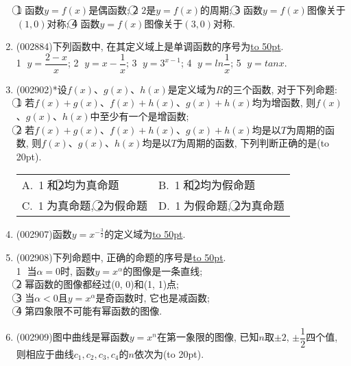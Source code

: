 \documentclass[10pt,a4paper]{article}
\newcommand{\blank}[1]{\underline{\hbox to #1pt{}}}
\newcommand{\bracket}[1]{(\hbox to #1pt{})}
\newcommand{\twoch}[4]{\par\begin{tabular}{p{.46\textwidth}p{.46\textwidth}}
A.~#1& B.~#2\\
C.~#3& D.~#4
\end{tabular}}
\begin{document}
\begin{enumerate}[1.]
\textcircled{1} 函数$y=f(x)$是偶函数; \textcircled{2} $2$是$y=f(x)$的周期; \textcircled{3} 函数$y=f(x)$图像关于$(1,0)$对称; \textcircled{4} 函数$y=f(x)$图像关于$(3,0)$对称.
\item {\tiny (002884)}下列函数中, 在其定义域上是单调函数的序号为\blank{50}.\\
\textcircled{1} $y=\dfrac{2-x}x$; \textcircled{2} $y=x-\dfrac 1x$; \textcircled{3} $y={3^{x-1}}$; \textcircled{4} $y=ln\dfrac 1x$; \textcircled{5} $y=tanx$.
\item {\tiny (002902)}*设$f(x)$、$g(x)$、$h(x)$是定义域为$R$的三个函数, 对于下列命题:\\
\textcircled{1} 若$f(x)+g(x)$、$f(x)+h(x)$、$g(x)+h(x)$均为增函数, 则$f(x)$、$g(x)$、$h(x)$中至少有一个是增函数;\\
\textcircled{2} 若$f(x)+g(x)$、$f(x)+h(x)$、$g(x)+h(x)$均是以$T$为周期的函数, 则$f(x)$、$g(x)$、$h(x)$均是以$T$为周期的函数, 下列判断正确的是\bracket{20}.
\twoch{\textcircled{1}和\textcircled{2}均为真命题}{\textcircled{1}和\textcircled{2}均为假命题}{\textcircled{1}为真命题, \textcircled{2}为假命题}{\textcircled{1}为假命题, \textcircled{2}为真命题}
\item {\tiny (002907)}函数$y=x^{-\frac 32}$的定义域为\blank{50}.
\item {\tiny (002908)}下列命题中, 正确的命题的序号是\blank{50}.\\
\textcircled{1} 当$\alpha =0$时, 函数$y={x^{\alpha }}$的图像是一条直线;\\
\textcircled{2} 幂函数的图像都经过(0, 0)和(1, 1)点;\\
\textcircled{3} 当$\alpha <0$且$y={x^{\alpha }}$是奇函数时, 它也是减函数;\\
\textcircled{4} 第四象限不可能有幂函数的图像.
\item {\tiny (002909)}图中曲线是幂函数$y=x^n$在第一象限的图像, 已知$n$取$\pm 2$, $\pm\dfrac 12$四个值, 则相应于曲线$c_1,c_2,c_3,c_4$的$n$依次为\bracket{20}.
\begin{center}
\end{center}
\end{enumerate}
\end{document}
